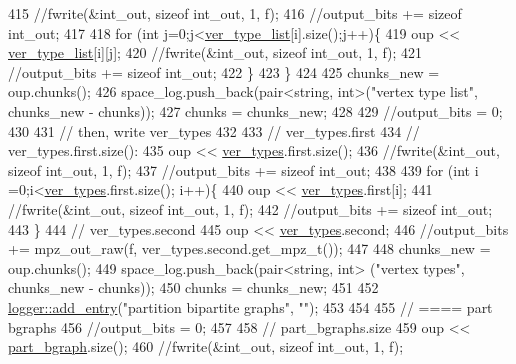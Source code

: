 \begin{DoxyCode}
415     \textcolor{comment}{//fwrite(&int\_out, sizeof int\_out, 1, f);}
416     \textcolor{comment}{//output\_bits += sizeof int\_out;}
417 
418     \textcolor{keywordflow}{for} (\textcolor{keywordtype}{int} j=0;j<\hyperlink{classmarked__graph__compressed_af2e3e55223d436628a02758dfae88493}{ver\_type\_list}[i].size();j++)\{
419       oup << \hyperlink{classmarked__graph__compressed_af2e3e55223d436628a02758dfae88493}{ver\_type\_list}[i][j];
420       \textcolor{comment}{//fwrite(&int\_out, sizeof int\_out, 1, f);}
421       \textcolor{comment}{//output\_bits += sizeof int\_out;}
422     \}
423   \}
424 
425   chunks\_new = oup.chunks();
426   space\_log.push\_back(pair<string, int>(\textcolor{stringliteral}{"vertex type list"}, chunks\_new - chunks));
427   chunks = chunks\_new;
428 
429   \textcolor{comment}{//output\_bits = 0;}
430   
431   \textcolor{comment}{// then, write ver\_types}
432 
433   \textcolor{comment}{// ver\_types.first}
434   \textcolor{comment}{// ver\_types.first.size():}
435   oup << \hyperlink{classmarked__graph__compressed_af446cc5e23c241a92b76642fd5ebc403}{ver\_types}.first.size();
436   \textcolor{comment}{//fwrite(&int\_out, sizeof int\_out, 1, f);}
437   \textcolor{comment}{//output\_bits += sizeof int\_out;}
438 
439   \textcolor{keywordflow}{for} (\textcolor{keywordtype}{int} i =0;i<\hyperlink{classmarked__graph__compressed_af446cc5e23c241a92b76642fd5ebc403}{ver\_types}.first.size(); i++)\{
440     oup <<  \hyperlink{classmarked__graph__compressed_af446cc5e23c241a92b76642fd5ebc403}{ver\_types}.first[i];
441     \textcolor{comment}{//fwrite(&int\_out, sizeof int\_out, 1, f);}
442     \textcolor{comment}{//output\_bits += sizeof int\_out;}
443   \}
444   \textcolor{comment}{// ver\_types.second}
445   oup << \hyperlink{classmarked__graph__compressed_af446cc5e23c241a92b76642fd5ebc403}{ver\_types}.second;
446   \textcolor{comment}{//output\_bits += mpz\_out\_raw(f, ver\_types.second.get\_mpz\_t());}
447 
448   chunks\_new = oup.chunks();
449   space\_log.push\_back(pair<string, int> (\textcolor{stringliteral}{"vertex types"}, chunks\_new - chunks));
450   chunks = chunks\_new;
451 
452   \hyperlink{classlogger_a710163deb17bc81f70d53d285b8ac9ac}{logger::add\_entry}(\textcolor{stringliteral}{"partition bipartite graphs"}, \textcolor{stringliteral}{""});
453   
454 
455   \textcolor{comment}{// ==== part bgraphs}
456   \textcolor{comment}{//output\_bits = 0;}
457 
458   \textcolor{comment}{// part\_bgraphs.size}
459   oup << \hyperlink{classmarked__graph__compressed_a7b3267063fba30b45eb21b3ba4e07536}{part\_bgraph}.size();
460   \textcolor{comment}{//fwrite(&int\_out, sizeof int\_out, 1, f);}

\end{DoxyCode}
